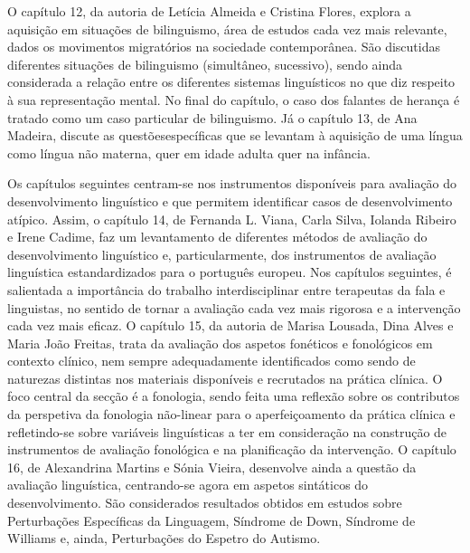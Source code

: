 O capítulo 12, da autoria de Letícia Almeida e Cristina Flores, explora a aquisição em situações de bilinguismo, área de estudos cada vez mais relevante, dados os movimentos migratórios na sociedade contemporânea. São discutidas diferentes situações de bilinguismo (simultâneo, sucessivo), sendo ainda considerada a relação entre os diferentes sistemas linguísticos no que diz respeito à sua representação mental. No final do capítulo, o caso dos falantes de herança é tratado como um caso particular de bilinguismo. Já o capítulo 13, de Ana Madeira, discute as questões\largerpage específicas que se levantam à aquisição de uma língua como língua não materna, quer em idade adulta quer na infância. 

Os capítulos seguintes centram-se nos instrumentos disponíveis para avaliação do desenvolvimento linguístico e que permitem identificar casos de desenvolvimento atípico. Assim, o capítulo 14, de Fernanda L. Viana, Carla Silva, Iolanda Ribeiro e Irene Cadime, faz um levantamento de diferentes métodos de avaliação do desenvolvimento linguístico e, particularmente, dos instrumentos de avaliação linguística estandardizados para o português europeu. Nos capítulos seguintes, é salientada a importância do trabalho interdisciplinar entre terapeutas da fala e linguistas, no sentido de tornar a avaliação cada vez mais rigorosa e a intervenção cada vez mais eficaz. O capítulo 15, da autoria de Marisa Lousada, Dina Alves e Maria João Freitas, trata da avaliação dos aspetos fonéticos e fonológicos em contexto clínico, nem sempre adequadamente identificados como sendo de naturezas distintas nos materiais disponíveis e recrutados na prática clínica. O foco central da secção é a fonologia, sendo feita uma reflexão sobre os contributos da perspetiva da fonologia não-linear para o aperfeiçoamento da prática clínica e refletindo-se sobre variáveis linguísticas a ter em consideração na construção de instrumentos de avaliação fonológica e na planificação da intervenção. O capítulo 16, de Alexandrina Martins e Sónia Vieira, desenvolve ainda a questão da avaliação linguística, centrando-se agora em aspetos sintáticos do desenvolvimento. São considerados resultados obtidos em estudos sobre Perturbações Específicas da Linguagem, Síndrome de Down, Síndrome de Williams e, ainda, Perturbações do Espetro do Autismo. 

